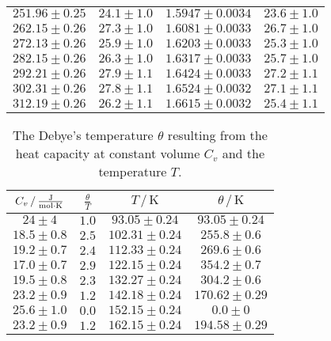 \begin{table}
\begin{tabular}{c c c c}
        $251.96\pm0.25$ & $24.1\pm1.0$ & $1.5947\pm0.0034$ & $23.6\pm1.0$ \\
        $262.15\pm0.26$ & $27.3\pm1.0$ & $1.6081\pm0.0033$ & $26.7\pm1.0$ \\
        $272.13\pm0.26$ & $25.9\pm1.0$ & $1.6203\pm0.0033$ & $25.3\pm1.0$ \\
        $282.15\pm0.26$ & $26.3\pm1.0$ & $1.6317\pm0.0033$ & $25.7\pm1.0$ \\
        $292.21\pm0.26$ & $27.9\pm1.1$ & $1.6424\pm0.0033$ & $27.2\pm1.1$ \\
        $302.31\pm0.26$ & $27.8\pm1.1$ & $1.6524\pm0.0032$ & $27.1\pm1.1$ \\
        $312.19\pm0.26$ & $26.2\pm1.1$ & $1.6615\pm0.0032$ & $25.4\pm1.1$ \\
        \bottomrule
    \end{tabular}
\end{table}

\begin{table}
    \centering
    \caption{The Debye's temperature $\theta$ resulting from the heat capacity at constant volume $C_v$ and the temperature $T$.}
    \label{tab:debye}
    \begin{tabular}{c c c c}
        \toprule
        $C_v \,/\, \unit{\frac{\joule}{\mol \cdot \kelvin}}$ & $\frac{\theta}{T}$ & $T \,/\, \unit{\kelvin}$ & $\theta \,/\, \unit{\kelvin}$ \\
        \midrule
        $24\pm4$ & $1.0$ & $93.05\pm0.24$ & $93.05\pm0.24$ \\
        $18.5\pm0.8$ & $2.5$ & $102.31\pm0.24$ & $255.8\pm0.6$ \\
        $19.2\pm0.7$ & $2.4$ & $112.33\pm0.24$ & $269.6\pm0.6$ \\
        $17.0\pm0.7$ & $2.9$ & $122.15\pm0.24$ & $354.2\pm0.7$ \\
        $19.5\pm0.8$ & $2.3$ & $132.27\pm0.24$ & $304.2\pm0.6$ \\
        $23.2\pm0.9$ & $1.2$ & $142.18\pm0.24$ & $170.62\pm0.29$ \\
        $25.6\pm1.0$ & $0.0$ & $152.15\pm0.24$ & $0.0\pm0$ \\
        $23.2\pm0.9$ & $1.2$ & $162.15\pm0.24$ & $194.58\pm0.29$ \\
        \bottomrule
    \end{tabular}
\end{table}